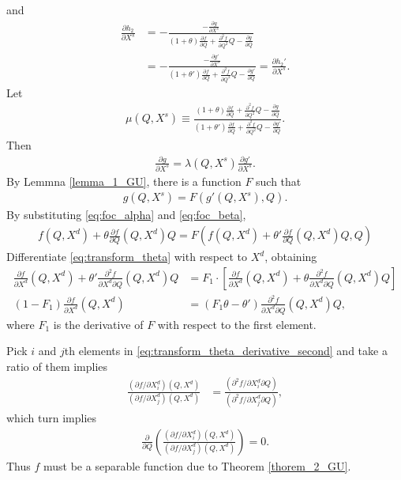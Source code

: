 \documentclass[11pt, a4paper]{article}
\theoremstyle{remark}
\begin{document}
and
\begin{align}
    \frac{\partial h_2}{\partial X^{s}} & = -\frac{-\frac{\partial g}{\partial X^{s}}}{(1+\theta)\frac{\partial f}{\partial Q} + \frac{\partial^2 f}{\partial Q^2}Q - \frac{\partial g}{\partial Q}} \\
     & = -\frac{-\frac{\partial g'}{\partial X^{s}}}{(1+\theta')\frac{\partial f}{\partial Q} + \frac{\partial^2 f}{\partial Q^2}Q - \frac{\partial g'}{\partial Q}} = \frac{\partial h_2'}{\partial X^{s}}.
\end{align}
Let
\begin{align}
    \mu(Q,X^{s}) \equiv \frac{(1+\theta)\frac{\partial f}{\partial Q} + \frac{\partial^2 f}{\partial Q^2}Q - \frac{\partial g}{\partial Q}}{(1+\theta')\frac{\partial f}{\partial Q} + \frac{\partial^2 f}{\partial Q^2}Q - \frac{\partial g'}{\partial Q}}.
\end{align}
Then 
\begin{align}
    \frac{\partial g}{\partial X^{s}} = \lambda(Q, X^{s}) \frac{\partial g'}{\partial X^{s}}. \label{eq:transformation_g}
\end{align}
By Lemmna \ref{lemma_1_GU}, there is a function $F$ such that
\begin{align}
    g(Q,X^{s}) = F(g'(Q,X^{s}), Q).
\end{align}
By substituting \eqref{eq:foc_alpha} and \eqref{eq:foc_beta},
\begin{align}
    f(Q, X^{d}) + \theta \frac{\partial f}{\partial Q}(Q, X^{d})Q  = F\left(f(Q, X^{d}) + \theta' \frac{\partial f}{\partial Q}(Q, X^{d})Q, Q \right) \label{eq:transform_theta}
\end{align}
Differentiate \eqref{eq:transform_theta} with respect to $X^{d}$, obtaining
\begin{align}
\frac{\partial f}{\partial X^{d}}(Q, X^{d}) + \theta' \frac{\partial^2 f}{\partial X^{d} \partial Q}(Q, X^{d})Q &= F_{1} \cdot \left[\frac{\partial f}{\partial X^{d}}(Q, X^{d}) + \theta \frac{\partial^2 f}{\partial X^{d} \partial Q}(Q, X^{d})Q\right]\label{eq:transform_theta_derivative_first}\\
(1 - F_{1}) \frac{\partial f}{\partial X^{d}}(Q, X^{d}) & = (F_{1} \theta - \theta')\frac{\partial^2 f}{\partial X^{d} \partial Q}(Q, X^{d})Q,\label{eq:transform_theta_derivative_second}
\end{align}
where $F_1$ is the derivative of $F$ with respect to the first element. 

Pick $i$ and $j$th elements in \eqref{eq:transform_theta_derivative_second} and take a ratio of them implies
\begin{align}
\frac{(\partial f/\partial X^{d}_{i})(Q, X^{d})}{(\partial f/\partial X^{d}_{j})(Q, X^{d})} & = \frac{(\partial^2 f/\partial X^{d}_{i} \partial Q)}{(\partial^2 f/\partial X^{d}_{j} \partial Q)},\label{eq:ratio_foc}
\end{align}
which turn implies
\begin{align}
    \frac{\partial}{\partial Q}\left(\frac{(\partial f/\partial X^{d}_{i})(Q, X^{d})}{(\partial f/\partial X^{d}_{j})(Q, X^{d})}\right) =0.\label{eq:derivative_separable}
\end{align}
Thus $f$ must be a separable function due to Theorem \ref{thorem_2_GU}.
\end{document}

